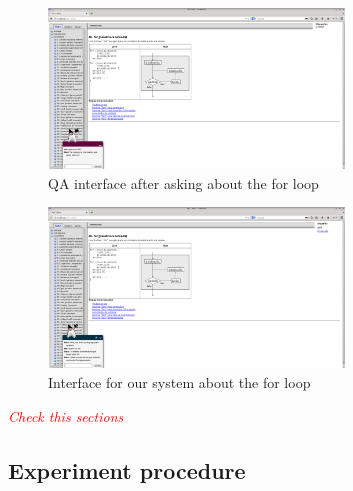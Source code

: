 \begin{figure}[!htbp]
    \centering
    \includegraphics[width=0.7\textwidth]{img/test/qa-client2.png}
    \caption{QA interface after asking about the for loop}
    \label{fig:qa-client-for}
\end{figure}

\begin{figure}[!htbp]
    \centering
    \includegraphics[width=0.7\textwidth]{img/test/ask-client.png}
    \caption{Interface for our system about the for loop}
    \label{fig:ask-client-for}
\end{figure}

\emph{\textcolor{red}{Check this sections}}

\subsection{Experiment procedure}

